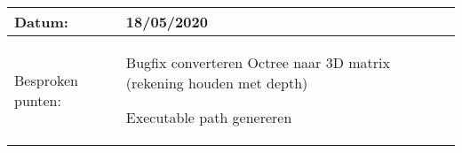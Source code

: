 \begin{tabularx}{\textwidth}{| l | X |}
  \hline
  Datum: & 18/05/2020\\
  \hline
  Besproken punten: &
  \begin{compactitem}
    \item Bugfix converteren Octree naar 3D matrix (rekening houden met depth)
    \item Executable path genereren
  \end{compactitem}\\
  \hline
\end{tabularx}